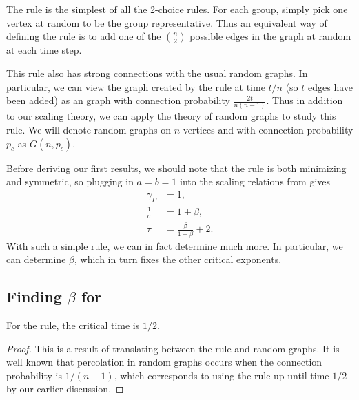 \documentclass[twoside,10pt]{article}
\begin{document}
\section{\ER}

The \ER rule is the simplest of all the 2-choice rules. For each group, simply pick one vertex at random to be the group representative. Thus an equivalent way of defining the \ER rule is to add one of the $\binom{n}{2}$ possible edges in the graph at random at each time step.

This rule also has strong connections with the usual \ER random graphs. In particular, we can view the graph created by the \ER rule at time $t/n$ (so $t$ edges have been added) as an \ER graph with connection probability $\frac{2t}{n(n-1)}$. Thus in addition to our scaling theory, we can apply the theory of \ER random graphs to study this rule. We will denote \ER random graphs on $n$ vertices and with connection probability $p_c$ as $G(n,p_{c})$.

Before deriving our first results, we should note that the \ER rule is both minimizing and symmetric, so plugging in $a=b=1$ into the scaling relations from  gives
\begin{align*}
        \gamma_{P} &= 1,\\
        \frac{1}{\sigma} &= 1 + \beta,\\
        \tau &= \frac{\beta}{1+\beta} +2.
\end{align*}
With such a simple rule, we can in fact determine much more. In particular, we can determine $\beta$, which in turn fixes the other critical exponents.

\subsection{Finding \texorpdfstring{$\beta$}{beta} for \ER}
\label{finding-beta}

\begin{lem}
	\label{er-critical-time-1}
	For the \ER rule, the critical time is $1/2$.
\end{lem}
\begin{proof}
	This is a result of translating between the \ER rule and \ER random graphs. It is well known \autocite{princeton} that percolation in \ER random graphs occurs when the connection probability is $1/(n-1)$, which corresponds to using the \ER rule up until time $1/2$ by our earlier discussion.
\end{proof}
\end{document}
